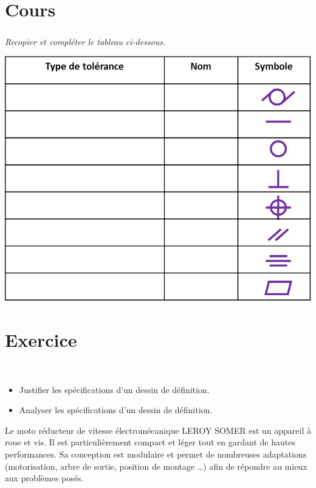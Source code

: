 \documentclass[10pt,fleqn]{article} %
\begin{document}

\vspace{7cm}
\pagestyle{fancy}
\thispagestyle{plain}


\def\columnseprulecolor{\color{ocre}}
\setlength{\columnseprule}{0.4pt} 

\begin{multicols}{2}
\section*{Cours}

\subparagraph{}\textit{Recopier et compléter le tableau ci-dessous.}

\begin{center}
\includegraphics[width=.8\linewidth]{images/cours_01}
\end{center}


\section*{Exercice}
\begin{obj}~\\
\begin{itemize}
\item Justifier les spécifications d'un dessin de définition.
\item Analyser les spécifications d'un dessin de définition.
\end{itemize}
\end{obj}

Le moto réducteur de vitesse électromécanique LEROY SOMER  est un appareil à roue et vis. Il est particulièrement compact et léger tout en gardant de hautes performances.
Sa conception est modulaire et permet de nombreuses adaptations (motorisation, arbre de sortie, position de montage …) afin de répondre au mieux aux problèmes posés. 


\end{multicols}
\end{document}
